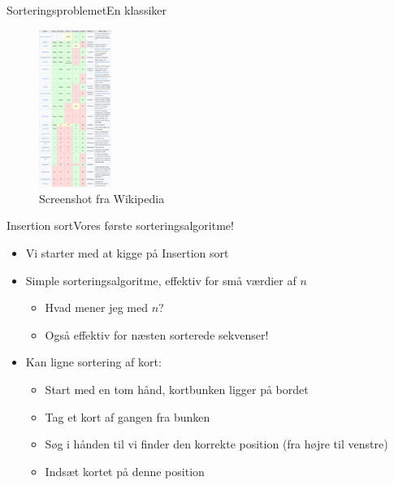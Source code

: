 \documentclass[aspectratio=1610]{beamer}
\begin{document}
\begin{frame}{Sorteringsproblemet}{En klassiker}
    \begin{figure}[h]
        \centering
        \includegraphics[width=0.21\textwidth]{sorting-algorithms-wiki}
        \caption{Screenshot fra Wikipedia}
        \label{fig:sorting-algorithms-wiki}
    \end{figure}
\end{frame}

\begin{frame}{Insertion sort}{Vores første sorteringsalgoritme!}
    \begin{itemize}
        \item Vi starter med at kigge på \alert{Insertion sort}
        \item Simple sorteringsalgoritme, effektiv for små værdier af $n$
            \begin{itemize}
                \item Hvad mener jeg med $n$?
                \item Også effektiv for \alert{næsten sorterede} sekvenser!
            \end{itemize}
        \item Kan ligne sortering af kort:
            \begin{itemize}
                \item Start med en tom hånd, kortbunken ligger på bordet
                \item Tag et kort af gangen fra bunken
                \item Søg i hånden til vi finder den korrekte position (fra
                    højre til venstre)
                \item Indsæt kortet på denne position
            \end{itemize}
    \end{itemize}
\end{frame}
\end{document}
